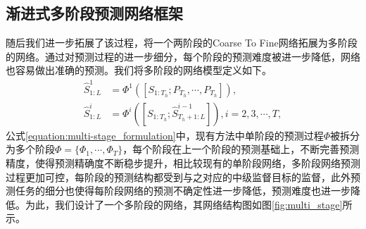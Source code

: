 \subsection{渐进式多阶段预测网络框架}
随后我们进一步拓展了该过程，将一个两阶段的Coarse To Fine网络拓展为多阶段的网络。通过对预测过程的进一步细分，每个阶段的预测难度被进一步降低，网络也容易做出准确的预测。\textcolor[rgb]{1,0,0}{我们将多阶段的网络模型定义如下}。
\begin{equation}
    \begin{aligned}
         \hat{S}_{1:L}^{1} &= \Phi^1([{S}_{1:T_h};P_{T_h},\cdots,P_{T_h}]), \\
        \hat{S}_{1:L}^{i} &= \Phi^i([S_{1:T_h};\hat{S}_{T_h+1:L}^{i-1}]), i = {2,3,\cdots,T},
    \end{aligned}
    \label{equation:multi-stage_formulation}
\end{equation}
公式\ref{equation:multi-stage_formulation}中，现有方法中单阶段的预测过程$\Phi$被拆分为多个阶段$\Phi = \{ \Phi_1, \cdots, \Phi_T\}$，每个阶段在上一个阶段的预测基础上，不断完善预测精度，使得预测精确度不断稳步提升，相比较现有的单阶段网络，多阶段网络预测过程更加可控，每阶段的预测结构都受到与之对应的中级监督目标的监督，此外预测任务的细分也使得每阶段网络的预测不确定性进一步降低，预测难度也进一步降低。为此，我们设计了一个多阶段的网络，其网络结构图如图\ref{fig:multi_stage}所示。

